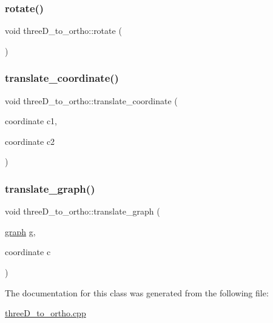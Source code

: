 \mbox{\label{classthreeD__to__ortho_a14f6162b721d0f59aec4b08b38e45212}} 
\subsubsection{\texorpdfstring{rotate()}{rotate()}}
{\footnotesize\ttfamily void three\+D\+\_\+to\+\_\+ortho\+::rotate (\begin{DoxyParamCaption}{ }\end{DoxyParamCaption})\hspace{0.3cm}{\ttfamily [inline]}}

\mbox{\label{classthreeD__to__ortho_a3d16f355dc29a6de3073700246a50fc0}} 
\subsubsection{\texorpdfstring{translate\+\_\+coordinate()}{translate\_coordinate()}}
{\footnotesize\ttfamily void three\+D\+\_\+to\+\_\+ortho\+::translate\+\_\+coordinate (\begin{DoxyParamCaption}\item[{coordinate}]{c1,  }\item[{coordinate}]{c2 }\end{DoxyParamCaption})\hspace{0.3cm}{\ttfamily [inline]}}

\mbox{\label{classthreeD__to__ortho_a721cf3d866a5b6abf941c726fca3cadc}} 
\subsubsection{\texorpdfstring{translate\+\_\+graph()}{translate\_graph()}}
{\footnotesize\ttfamily void three\+D\+\_\+to\+\_\+ortho\+::translate\+\_\+graph (\begin{DoxyParamCaption}\item[{\hyperlink{structgraph}{graph}}]{g,  }\item[{coordinate}]{c }\end{DoxyParamCaption})\hspace{0.3cm}{\ttfamily [inline]}}



The documentation for this class was generated from the following file\+:\begin{DoxyCompactItemize}
\item 
\hyperlink{threeD__to__ortho_8cpp}{three\+D\+\_\+to\+\_\+ortho.\+cpp}\end{DoxyCompactItemize}
